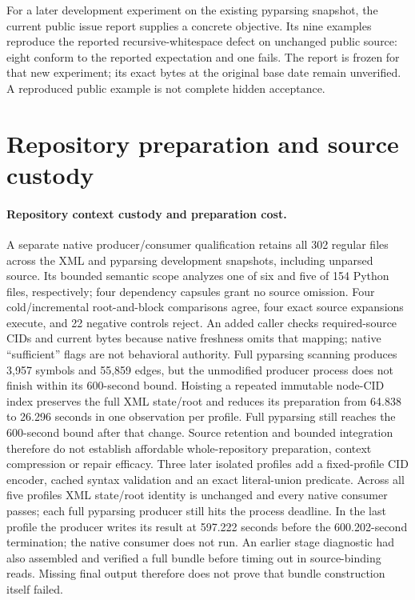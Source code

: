 For a later development experiment on the existing pyparsing snapshot, the
current public issue report supplies a concrete objective. Its nine examples
reproduce the reported recursive-whitespace defect on unchanged public source:
eight conform to the reported expectation and one fails. The report is frozen
for that new experiment; its exact bytes at the original base date remain
unverified. A reproduced public example is not complete hidden acceptance.

\section{Repository preparation and source custody}
\label{sec:incremental-context-preparation}
\paragraph{Repository context custody and preparation cost.}
A separate native producer/consumer qualification retains all 302 regular files
across the XML and pyparsing development snapshots, including unparsed source.
Its bounded semantic scope analyzes one of six and five of 154 Python files,
respectively; four dependency capsules grant no source omission. Four
cold/incremental root-and-block comparisons agree, four exact source expansions
execute, and 22 negative controls reject. An added caller checks required-source
CIDs and current bytes because native freshness omits that mapping; native
``sufficient'' flags are not behavioral authority. Full pyparsing scanning
produces 3,957 symbols and 55,859 edges, but the unmodified producer process does
not finish within its 600-second bound. Hoisting a repeated immutable
node-CID index preserves the full XML state/root and reduces its preparation
from 64.838 to 26.296 seconds in one observation per profile. Full pyparsing
still reaches the 600-second bound after that change. Source retention and
bounded integration therefore do not establish affordable whole-repository
preparation, context compression or repair efficacy. Three later isolated
profiles add a fixed-profile CID encoder, cached syntax validation and an exact
literal-union predicate. Across all five profiles XML state/root identity is
unchanged and every native consumer passes; each full pyparsing producer still
hits the process deadline. In the last profile the producer writes its result
at 597.222 seconds before the 600.202-second termination; the native consumer
does not run. An earlier stage diagnostic had also assembled and verified a
full bundle before timing out in source-binding reads. Missing final output
therefore does not prove that bundle construction itself failed.

